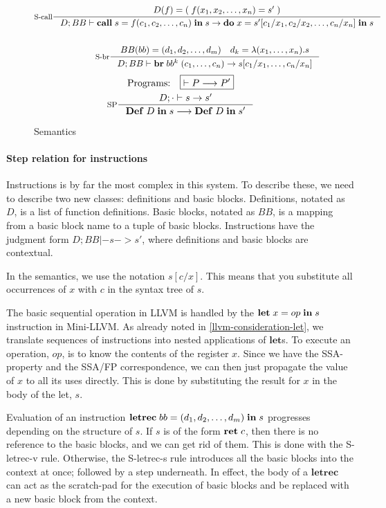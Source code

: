 \documentclass[a4paper, oneside, 10pt, draft]{memoir}
\begin{document}
\begin{figure}
\begin{gather*}
    \inference[S-call]{D(f) = (\;f(x_1, x_2, \dotsc, x_n) = s'\;)}{D;BB |-
      \icall{s}{f}{(c_1, c_2, \dotsc, c_n)}{s} -> \ido{x}{s'[c_1/x_1, c_2/x_2,
        \dotsc, c_n/x_n]}{s}}\\\\
    \inference[S-br]{BB(bb) = \dbundle \quad d_k = \lambda(x_1, \dotsc,
      x_n).s}{D;BB |- \ibr{bb^k}{(c_1, \dotsc, c_n)} -> s[c_1/x_1, \dotsc, c_n/x_n]}
 \end{gather*}
 \begin{gather*}
   \text{Programs:} \quad \boxed{|- P --> P'}\\
   \inference[SP]{D;\cdot |- s -> s'}{\ipgm{D}{s} --> \ipgm{D}{s'}}
 \end{gather*}
  \caption{Semantics}
  \label{fig:semantics}
\end{figure}

\paragraph{Step relation for instructions}

Instructions is by far the most complex in this system. To describe
these, we need to describe two new classes: definitions and basic
blocks. Definitions, notated as $D$, is a list of function
definitions. Basic blocks, notated as $BB$, is a mapping from a basic
block name to a tuple of basic blocks. Instructions have the
judgment form $\boxed{D;BB |- s -> s'}$, where definitions and basic
blocks are contextual.

In the semantics, we use the notation $s[c/x]$. This means that you
substitute all occurrences of $x$ with $c$ in the syntax tree of
$s$.

The basic sequential operation in LLVM is handled by the
$\mathbf{let} \; x = op \; \mathbf{in} \; s$ instruction in Mini-LLVM. As already noted in
\ref{llvm-consideration-let}, we translate sequences of instructions
into nested applications of $\mathbf{let}$s. To execute an operation,
$op$, is to know the contents of the register $x$. Since we have the
SSA-property and the SSA/FP correspondence, we can then just propagate
the value of $x$ to all its uses directly. This is done by
substituting the result for $x$ in the body of the let, $s$.

Evaluation of an instruction $\mathbf{letrec} \; bb = (d_1, d_2, \dotsc, d_m) \; \mathbf{in} \; s$ progresses
depending on the structure of $s$. If $s$ is of the form $\mathbf{ret} \; c$,
then there is no reference to the basic blocks, and we can get rid of
them. This is done with the S-letrec-v rule. Otherwise, the S-letrec-s
rule introduces all the basic blocks into the context at once;
followed by a step underneath.  In effect, the body of a
$\mathbf{letrec}$ can act as the scratch-pad for the execution of
basic blocks and be replaced with a new basic block from the context.
\end{document}
